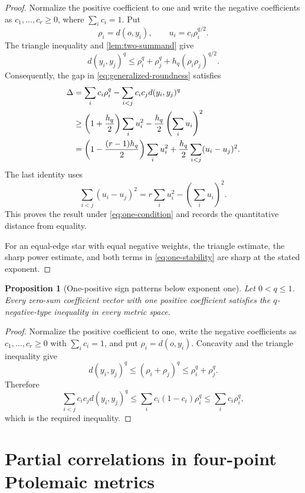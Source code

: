 \documentclass[11pt]{amsart}
\newtheorem{proposition}[proposition]{Proposition}
\theoremstyle{definition}
\theoremstyle{remark}
\begin{document}
\begin{proof}
Normalize the positive coefficient to one and write the negative coefficients as $c_1,\ldots,c_r\ge0$, where $\sum_i c_i=1$. Put
\[
 \rho_i=d(o,y_i),
 \qquad
 u_i=c_i\rho_i^{q/2}.
\]
The triangle inequality and \cref{lem:two-summand} give
\[
 d(y_i,y_j)^q
 \le \rho_i^q+\rho_j^q+h_q(\rho_i\rho_j)^{q/2}.
\]
Consequently, the gap in \eqref{eq:generalized-roundness} satisfies
\begin{align}
 \Delta
 &=\sum_i c_i\rho_i^q-\sum_{i<j}c_ic_jd(y_i,y_j)^q\notag\\
 &\ge
 \left(1+\frac{h_q}{2}\right)\sum_i u_i^2
 -\frac{h_q}{2}\left(\sum_i u_i\right)^2\notag\\
 &=
 \left(1-\frac{(r-1)h_q}{2}\right)\sum_i u_i^2
 +\frac{h_q}{2}\sum_{i<j}(u_i-u_j)^2.
 \label{eq:one-stability}
\end{align}
The last identity uses
\[
 \sum_{i<j}(u_i-u_j)^2
 =r\sum_i u_i^2-\left(\sum_i u_i\right)^2.
\]
This proves the result under \eqref{eq:one-condition} and records the quantitative distance from equality.

For an equal-edge star with equal negative weights, the triangle estimate,
the sharp power estimate, and both terms in \eqref{eq:one-stability} are
sharp at the stated exponent.
\end{proof}

\begin{proposition}[One-positive sign patterns below exponent one]
\label{prop:one-anchor-subunit}
Let $0<q\le1$. Every zero-sum coefficient vector with one positive
coefficient satisfies the $q$-negative-type inequality in every metric
space.
\end{proposition}

\begin{proof}
Normalize the positive coefficient to one, write the negative
coefficients as $c_1,\ldots,c_r\ge0$ with $\sum_i c_i=1$, and put
$\rho_i=d(o,y_i)$. Concavity and the triangle inequality give
\[
 d(y_i,y_j)^q\le(\rho_i+\rho_j)^q\le\rho_i^q+\rho_j^q.
\]
Therefore
\[
 \sum_{i<j}c_ic_jd(y_i,y_j)^q
 \le\sum_i c_i(1-c_i)\rho_i^q
 \le\sum_i c_i\rho_i^q,
\]
which is the required inequality.
\end{proof}

\section{Partial correlations in four-point Ptolemaic metrics}
\end{document}
